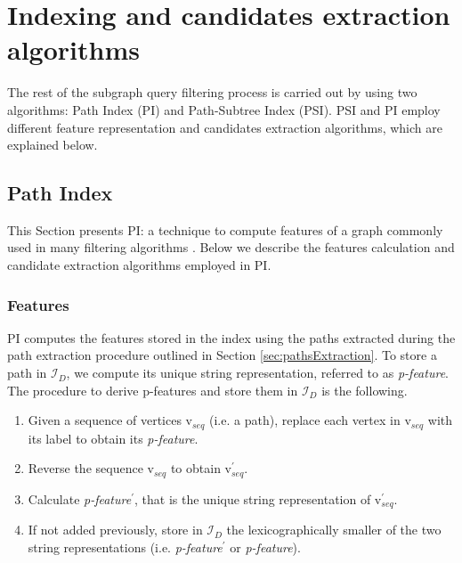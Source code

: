\documentclass{l4proj}
\newcommand{\fancyI}{\mathcal{I}}
\begin{document}

\section{Indexing and candidates extraction algorithms}
\label{sec:PIandPSI}
The rest of the subgraph query filtering process is carried out by using two algorithms: Path Index (PI) and Path-Subtree Index (PSI). PSI and PI employ different feature representation and candidates extraction algorithms, which are explained below.

\subsection{Path Index}
\label{sec:pi}
This Section presents PI: a technique to compute features of a graph commonly used in many filtering algorithms \cite{graphgrepsx}. Below we describe the features calculation and candidate extraction algorithms employed in PI.

\subsubsection{Features}
\label{sec:pifeatures}
PI computes the features stored in the index using the paths extracted during the path extraction procedure outlined in Section \ref{sec:pathsExtraction}. To store a path in $\fancyI_{D}$, we compute its unique string representation, referred to as \emph{p-feature}. The procedure to derive p-features and store them in $\fancyI_{D}$ is the following.
\begin{enumerate}
\item Given a sequence of vertices v$_{seq}$ (i.e. a path), replace each vertex in v$_{seq}$ with its label to obtain its \emph{p-feature}.
\item Reverse the sequence v$_{seq}$ to obtain v$_{seq}^{\prime}$.
\item Calculate \emph{p-feature}$^{\prime}$, that is the unique string representation of v$_{seq}^{\prime}$.
\item If not added previously, store in $\fancyI_{D}$ the lexicographically smaller of the two string representations (i.e. \emph{p-feature}$^{\prime}$ or \emph{p-feature}).
\end{enumerate}
\end{document}
